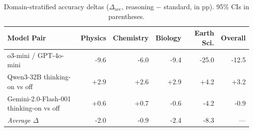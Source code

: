 \begin{table}[t]
\centering
\caption{Domain-stratified accuracy deltas ($\Delta_{\text{acc}}$, reasoning $-$ standard, in pp). 95\% CIs in parentheses.}
\label{tab:domain_asymmetry}
\begin{tabular}{lrrrrr}
\toprule
\textbf{Model Pair} & \textbf{Physics} & \textbf{Chemistry} & \textbf{Biology} & \textbf{Earth Sci.} & \textbf{Overall} \\
\midrule
o3-mini / GPT-4o-mini & -9.6 & -6.0 & -9.4 & -25.0 & -12.5 \\
Qwen3-32B thinking-on vs off & +2.9 & +2.6 & +2.9 & +4.2 & +3.2 \\
Gemini-2.0-Flash-001 thinking-on vs off & +0.6 & +0.7 & -0.6 & -4.2 & -0.9 \\
\midrule
\textit{Average $\Delta$} & -2.0 & -0.9 & -2.4 & -8.3 & — \\
\bottomrule
\end{tabular}
\end{table}